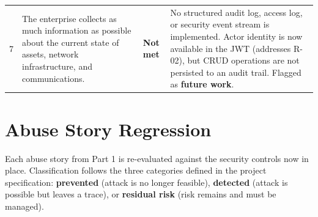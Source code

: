 \documentclass[12pt,a4paper]{report}
\begin{document}
\begin{longtable}{S{0.4cm} S{4.2cm} S{2.2cm} S{7.0cm}}
7 & The enterprise collects as much information as possible about the current state of assets, network infrastructure, and communications. &
  \textbf{Not met} &
  No structured audit log, access log, or security event stream is implemented. Actor identity is now available in the JWT (addresses R-02), but CRUD operations are not persisted to an audit trail. Flagged as \textbf{future work}. \\
\end{longtable}

\section{Abuse Story Regression}

Each abuse story from Part 1 is re-evaluated against the security controls now in place.
Classification follows the three categories defined in the project specification:
\textbf{prevented} (attack is no longer feasible), \textbf{detected} (attack is possible
but leaves a trace), or \textbf{residual risk} (risk remains and must be managed).
\end{document}
